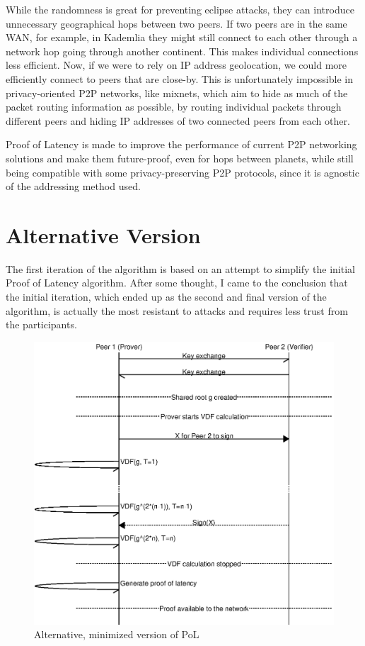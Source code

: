 While the randomness is great for preventing eclipse attacks, they can introduce unnecessary geographical hops between two peers. If two peers are in the same WAN, for example, in Kademlia they might still connect to each other through a network hop going through another continent. This makes individual connections less efficient.
Now, if we were to rely on IP address geolocation, we could more efficiently connect to peers that are close-by. This is unfortunately impossible in privacy-oriented P2P networks, like mixnets, which aim to hide as much of the packet routing information as possible, by routing individual packets through different peers and hiding IP addresses of two connected peers from each other.\cite{Harry_Halpin_undated-sq}

Proof of Latency is made to improve the performance of current P2P networking solutions and make them future-proof, even for hops between planets, while still being compatible with some privacy-preserving P2P protocols, since it is agnostic of the addressing method used.

\section{Alternative Version}
The first iteration of the algorithm is based on an attempt to simplify the initial Proof of Latency algorithm. After some thought, I came to the conclusion that the initial iteration, which ended up as the second and final version of the algorithm, is actually the most resistant to attacks and requires less trust from the participants.
\begin{figure}
	\includegraphics[width=\textwidth]{pictures/pol1_diagram.eps}
        \caption{Alternative, minimized version of PoL}
	\label{PoL Diagram 1}
\end{figure}

